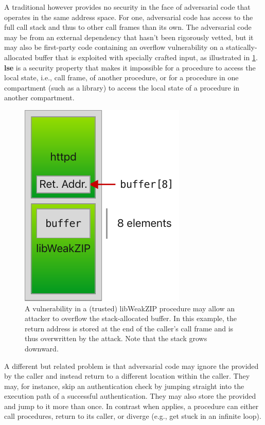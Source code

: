 \documentclass[main.tex]{subfiles}
\begin{document}
A traditional  however provides no security in the face of adversarial code that operates in the same address space. For one, adversarial code has access to the full call stack and thus to other call frames than its own. The adversarial code may be from an external dependency that hasn't been rigorously vetted, but it may also be first-party code containing an overflow vulnerability on a statically-allocated buffer that is exploited with specially crafted input, as illustrated in \cref{fig:buffoverflow}. \textbf{\Gls{lse}} is a security property that makes it impossible for a procedure to access the local state, i.e., call frame, of another procedure, or for a procedure in one compartment (such as a library) to access the local state of a procedure in another compartment.

\begin{figure}
	\begin{center}
		\includegraphics{Images/Buffer Overflow.pdf}
	\end{center}
	\caption{A vulnerability in a (trusted) libWeakZIP procedure may allow an attacker to overflow the stack-allocated buffer. In this example, the return address is stored at the end of the caller's call frame and is thus overwritten by the attack. Note that the stack grows downward.}
	\label{fig:buffoverflow}
\end{figure}

A different but related problem is that adversarial code may ignore the  provided by the caller and instead return to a different location within the caller. They may, for instance, skip an authentication check by jumping straight into the execution path of a successful authentication. They may also store the provided  and jump to it more than once. In contrast when \textbf{} applies, a procedure can either call procedures, return to its caller, or diverge (e.g., get stuck in an infinite loop).
\end{document}
